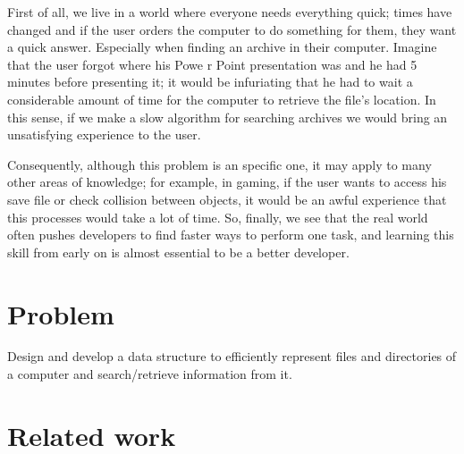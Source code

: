 \documentclass{sig-alternate-05-2015}
\begin{document}
    First of all, we live in a world where everyone needs everything quick; times have changed and if the user orders the computer
    to do something for them, they want a quick answer. Especially when finding an archive in their computer. Imagine that the
    user forgot where his Powe
    r Point presentation was and he had 5 minutes before presenting it; it would be infuriating that he
    had to wait a considerable amount of time for the computer to retrieve the file's location. In this sense, if we make a slow algorithm for searching
    archives we would bring an unsatisfying experience to the user.

    Consequently, although this problem is an specific one, it may apply to many other areas of knowledge; for example, in gaming,
    if the user wants to access his save file or check collision between objects, it would be an awful experience that this processes would take
    a lot of time. So, finally, we see that the real world often pushes developers to find faster ways to perform one task, and
    learning this skill from early on is almost essential to be a better developer.

  \section{Problem}
    Design and develop a data structure to efficiently represent files and directories of a computer and search/retrieve information from it.

  \section{Related work}
\end{document}

